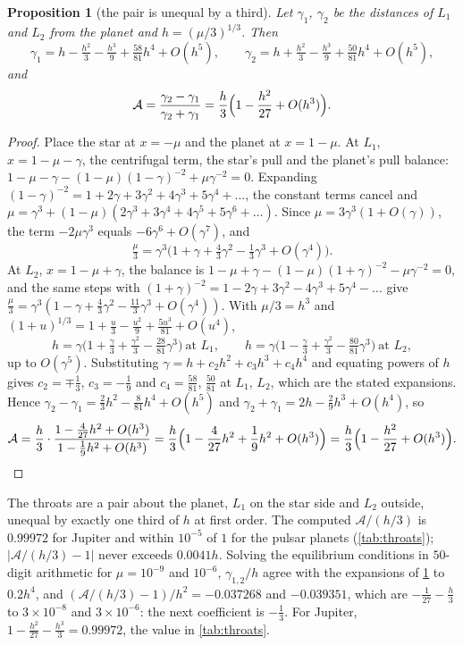 \documentclass[11pt]{article}
\newtheorem{proposition}[theorem]{Proposition}
\theoremstyle{definition}\newtheorem{definition}[theorem]{Definition}
\theoremstyle{remark}\newtheorem{remark}[theorem]{Remark}
\begin{document}
\begin{proposition}[the pair is unequal by a third]\label{prop:asym}
Let $\gamma_1$, $\gamma_2$ be the distances of $L_1$ and $L_2$ from the planet and $h=(\mu/3)^{1/3}$. Then
\[
\gamma_1=h-\tfrac{h^2}3-\tfrac{h^3}9+\tfrac{58}{81}h^4+O(h^5),\qquad \gamma_2=h+\tfrac{h^2}3-\tfrac{h^3}9+\tfrac{50}{81}h^4+O(h^5),
\]
and
\[
\mathcal A=\frac{\gamma_2-\gamma_1}{\gamma_2+\gamma_1}=\frac h3\Bigl(1-\frac{h^2}{27}+O(h^3)\Bigr).
\]
\end{proposition}
\begin{proof}
Place the star at $x=-\mu$ and the planet at $x=1-\mu$. At $L_1$, $x=1-\mu-\gamma$, the centrifugal term, the star's pull and the planet's pull balance: $1-\mu-\gamma-(1-\mu)(1-\gamma)^{-2}+\mu\gamma^{-2}=0$. Expanding $(1-\gamma)^{-2}=1+2\gamma+3\gamma^2+4\gamma^3+5\gamma^4+\dots$, the constant terms cancel and $\mu=\gamma^3+(1-\mu)(2\gamma^3+3\gamma^4+4\gamma^5+5\gamma^6+\dots)$. Since $\mu=3\gamma^3(1+O(\gamma))$, the term $-2\mu\gamma^3$ equals $-6\gamma^6+O(\gamma^7)$, and
\[
\tfrac\mu3=\gamma^3\bigl(1+\gamma+\tfrac43\gamma^2-\tfrac13\gamma^3+O(\gamma^4)\bigr).
\]
At $L_2$, $x=1-\mu+\gamma$, the balance is $1-\mu+\gamma-(1-\mu)(1+\gamma)^{-2}-\mu\gamma^{-2}=0$, and the same steps with $(1+\gamma)^{-2}=1-2\gamma+3\gamma^2-4\gamma^3+5\gamma^4-\dots$ give $\frac\mu3=\gamma^3(1-\gamma+\frac43\gamma^2-\frac{11}3\gamma^3+O(\gamma^4))$. With $\mu/3=h^3$ and $(1+u)^{1/3}=1+\frac u3-\frac{u^2}9+\frac{5u^3}{81}+O(u^4)$,
\[
h=\gamma\bigl(1+\tfrac\gamma3+\tfrac{\gamma^2}3-\tfrac{28}{81}\gamma^3\bigr)\ \text{at }L_1,\qquad h=\gamma\bigl(1-\tfrac\gamma3+\tfrac{\gamma^2}3-\tfrac{80}{81}\gamma^3\bigr)\ \text{at }L_2,
\]
up to $O(\gamma^5)$. Substituting $\gamma=h+c_2h^2+c_3h^3+c_4h^4$ and equating powers of $h$ gives $c_2=\mp\frac13$, $c_3=-\frac19$ and $c_4=\frac{58}{81}$, $\frac{50}{81}$ at $L_1$, $L_2$, which are the stated expansions. Hence $\gamma_2-\gamma_1=\frac23h^2-\frac8{81}h^4+O(h^5)$ and $\gamma_2+\gamma_1=2h-\frac29h^3+O(h^4)$, so
\[
\mathcal A=\frac h3\cdot\frac{1-\frac4{27}h^2+O(h^3)}{1-\frac19h^2+O(h^3)}=\frac h3\Bigl(1-\frac4{27}h^2+\frac19h^2+O(h^3)\Bigr)=\frac h3\Bigl(1-\frac{h^2}{27}+O(h^3)\Bigr).
\]
\end{proof}
The throats are a pair about the planet, $L_1$ on the star side and $L_2$ outside, unequal by exactly one third of $h$ at first order. The computed $\mathcal A/(h/3)$ is $0.99972$ for Jupiter and within $10^{-5}$ of $1$ for the pulsar planets (\cref{tab:throats}); $|\mathcal A/(h/3)-1|$ never exceeds $0.0041h$. Solving the equilibrium conditions in $50$-digit arithmetic for $\mu=10^{-9}$ and $10^{-6}$, $\gamma_{1,2}/h$ agree with the expansions of \cref{prop:asym} to $0.2h^4$, and $(\mathcal A/(h/3)-1)/h^2=-0.037268$ and $-0.039351$, which are $-\frac1{27}-\frac h3$ to $3\times10^{-8}$ and $3\times10^{-6}$: the next coefficient is $-\frac13$. For Jupiter, $1-\frac{h^2}{27}-\frac{h^3}3=0.99972$, the value in \cref{tab:throats}.
\end{document}

